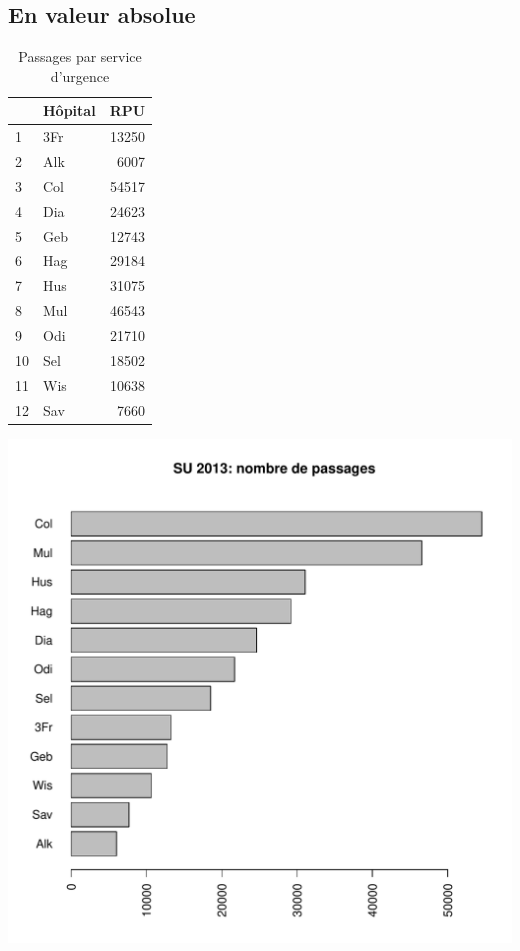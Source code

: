 \documentclass[12pt,english,french,twoside]{report}\usepackage[]{graphicx}\usepackage[]{color}
\makeatletter
\def\maxwidth{ %
  \ifdim\Gin@nat@width>\linewidth
    \linewidth
  \else
    \Gin@nat@width
  \fi
}
\makeatother
\begin{document}
\subsection*{En valeur absolue}
\begin{table}[ht]
\centering
\begin{tabular}{llr}
  \hline
 & Hôpital & RPU \\ 
  \hline
1 & 3Fr & 13250 \\ 
  2 & Alk & 6007 \\ 
  3 & Col & 54517 \\ 
  4 & Dia & 24623 \\ 
  5 & Geb & 12743 \\ 
  6 & Hag & 29184 \\ 
  7 & Hus & 31075 \\ 
  8 & Mul & 46543 \\ 
  9 & Odi & 21710 \\ 
  10 & Sel & 18502 \\ 
  11 & Wis & 10638 \\ 
  12 & Sav & 7660 \\ 
   \hline
\end{tabular}
\caption[Nombre de passages par service d'urgence]{Passages par service d'urgence} 
\label{fig:passage_su}
\end{table}

\includegraphics[width=\maxwidth]{figure/val_abs} 
\end{document}

